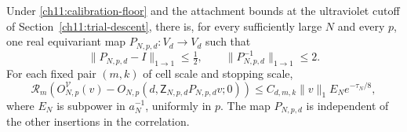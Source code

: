 \begin{proposition}
\label{ch11:equation-comparison}
Under \eqref{ch11:calibration-floor} and the attachment
bounds at the ultraviolet cutoff of Section~\ref{ch11:trial-descent}, there is, for every
sufficiently large $N$ and every $p$, one real equivariant map
$P_{N,p,d}:V_d\to V_d$ such that
\[
 \|P_{N,p,d}-I\|_{1\to1}\le\tfrac12,\qquad
 \|P_{N,p,d}^{-1}\|_{1\to1}\le2.
\]
For each fixed pair $(m,k)$ of cell scale and stopping scale,
\begin{equation}
 \mathcal R_m\!\left(
 O^{\mathcal V}_{N,p}(v)
   -O_{N,p}(d,\mathsf Z_{N,p,d}P_{N,p,d}v;0)\right)
 \le C_{d,m,k}\|v\|_1 E_N e^{-\tau_N/8},
 \label{ch11:equation-root-error}
\end{equation}
where $E_N$ is subpower in $a_N^{-1}$, uniformly in $p$.
The map $P_{N,p,d}$ is independent of the other insertions in the correlation.
\end{proposition}
